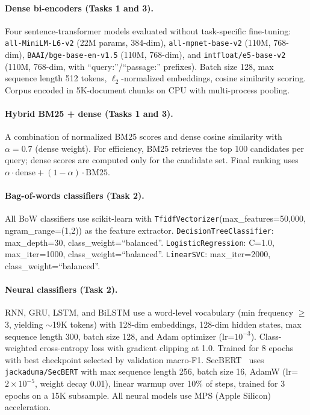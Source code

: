 \documentclass{article}
\begin{document}
\paragraph{Dense bi-encoders (Tasks 1 and 3).}
Four sentence-transformer models evaluated without task-specific fine-tuning: \texttt{all-MiniLM-L6-v2} (22M params, 384-dim), \texttt{all-mpnet-base-v2} (110M, 768-dim), \texttt{BAAI/bge-base-en-v1.5} (110M, 768-dim), and \texttt{intfloat/e5-base-v2} (110M, 768-dim, with ``query:''/``passage:'' prefixes). Batch size 128, max sequence length 512 tokens, $\ell_2$-normalized embeddings, cosine similarity scoring. Corpus encoded in 5K-document chunks on CPU with multi-process pooling.

\paragraph{Hybrid BM25 + dense (Tasks 1 and 3).}
A combination of normalized BM25 scores and dense cosine similarity with $\alpha{=}0.7$ (dense weight). For efficiency, BM25 retrieves the top 100 candidates per query; dense scores are computed only for the candidate set. Final ranking uses $\alpha \cdot \text{dense} + (1{-}\alpha) \cdot \text{BM25}$.

\paragraph{Bag-of-words classifiers (Task 2).}
All BoW classifiers use scikit-learn with \texttt{TfidfVectorizer}(max\_features=50{,}000, ngram\_range=(1,2)) as the feature extractor. \texttt{DecisionTreeClassifier}: max\_depth=30, class\_weight=``balanced''. \texttt{LogisticRegression}: C=1.0, max\_iter=1000, class\_weight=``balanced''. \texttt{LinearSVC}: max\_iter=2000, class\_weight=``balanced''.

\paragraph{Neural classifiers (Task 2).}
RNN, GRU, LSTM, and BiLSTM use a word-level vocabulary (min frequency $\geq$3, yielding ${\sim}$19K tokens) with 128-dim embeddings, 128-dim hidden states, max sequence length 300, batch size 128, and Adam optimizer (lr=$10^{-3}$). Class-weighted cross-entropy loss with gradient clipping at 1.0. Trained for 8 epochs with best checkpoint selected by validation macro-F1. SecBERT~\citep{secbert2022} uses \texttt{jackaduma/SecBERT} with max sequence length 256, batch size 16, AdamW (lr=$2{\times}10^{-5}$, weight decay 0.01), linear warmup over 10\% of steps, trained for 3 epochs on a 15K subsample. All neural models use MPS (Apple Silicon) acceleration.
\end{document}
